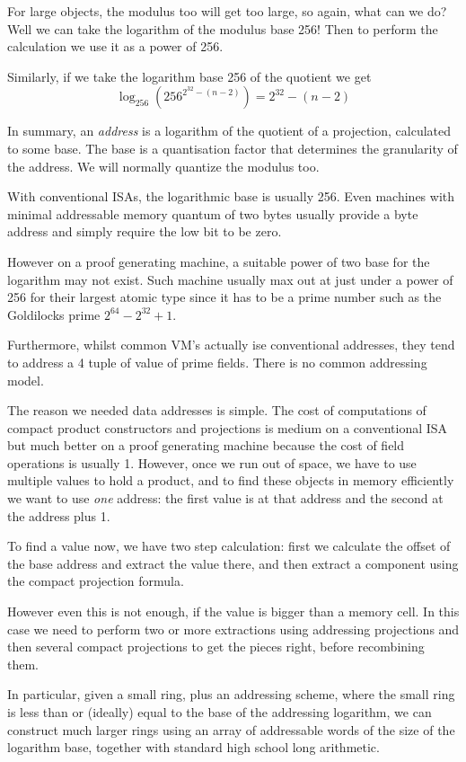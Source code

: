 \documentclass[oneside]{book}
\theoremstyle{plain}
\theoremstyle{definition}
\theoremstyle{plain}
\begin{document}
For large objects, the modulus too will get too large, so again,
what can we do? Well we can take the logarithm of the modulus
base 256! Then to perform the calculation we use it as a power
of 256.

Similarly, if we take the logarithm base 256 of the quotient we get
$$\log_256 (256 ^ {2^32 - (n - 2)}) = 2^32 - (n - 2) $$

In summary, an {\em address} is a logarithm of the quotient of
a projection, calculated to some base. The base is a quantisation
factor that determines the granularity of the address. We will normally
quantize the modulus too.

With conventional ISAs, the logarithmic base is usually 256. Even machines
with minimal addressable memory quantum of two bytes usually provide
a byte address and simply require the low bit to be zero.

However on a proof generating machine, a suitable power of two base
for the logarithm may not exist. Such machine usually max out at just
under a power of 256 for their largest atomic type since it has
to be a prime number such as the Goldilocks prime $2^64 - 2^32 + 1$.

Furthermore, whilst common VM's actually ise conventional addresses,
they tend to address a 4 tuple of value of prime fields. There is no
common addressing model.

The reason we needed data addresses is simple. The cost of computations
of compact product constructors and projections is medium on a conventional
ISA but much better on a proof generating machine because the cost of
field operations is usually 1. However, once we run out of space,
we have to use multiple values to hold a product, and to find these
objects in memory efficiently we want to use {\em one} address: the first
value is at that address and the second at the address plus 1.

To find a value now, we have two step calculation: first we calculate
the offset of the base address and extract the value there, and
then extract a component using the compact projection formula.

However even this is not enough, if the value is bigger than a memory
cell. In this case we need to perform two or more extractions
using addressing projections and then several compact projections
to get the pieces right, before recombining them.

In particular, given a small ring, plus an addressing scheme, where
the small ring is less than or (ideally) equal to the base of the addressing logarithm,
we can construct much larger rings using an array of addressable words
of the size of the logarithm base, together with standard high school
long arithmetic.
\end{document}
